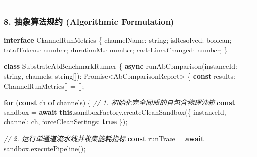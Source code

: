 \documentclass[
]{ctexart}
\newenvironment{Shaded}{}{}
\newcommand{\AttributeTok}[1]{\textcolor[rgb]{0.49,0.56,0.16}{#1}}
\newcommand{\BuiltInTok}[1]{\textcolor[rgb]{0.00,0.50,0.00}{#1}}
\newcommand{\CommentTok}[1]{\textcolor[rgb]{0.38,0.63,0.69}{\textit{#1}}}
\newcommand{\ControlFlowTok}[1]{\textcolor[rgb]{0.00,0.44,0.13}{\textbf{#1}}}
\newcommand{\DataTypeTok}[1]{\textcolor[rgb]{0.56,0.13,0.00}{#1}}
\newcommand{\FunctionTok}[1]{\textcolor[rgb]{0.02,0.16,0.49}{#1}}
\newcommand{\KeywordTok}[1]{\textcolor[rgb]{0.00,0.44,0.13}{\textbf{#1}}}
\newcommand{\NormalTok}[1]{#1}
\newcommand{\OperatorTok}[1]{\textcolor[rgb]{0.40,0.40,0.40}{#1}}
\renewcommand{\_}{\discretionary{}{}{\textunderscore}}
\begin{document}
\begin{center}\rule{0.5\linewidth}{0.5pt}\end{center}

\subsubsection{8. 抽象算法规约 (Algorithmic
Formulation)}\label{ux62bdux8c61ux7b97ux6cd5ux89c4ux7ea6-algorithmic-formulation-18}

\begin{Shaded}
\begin{Highlighting}[]
\KeywordTok{interface}\NormalTok{ ChannelRunMetrics \{}
\NormalTok{  channelName}\OperatorTok{:} \DataTypeTok{string}\OperatorTok{;}
\NormalTok{  isResolved}\OperatorTok{:} \DataTypeTok{boolean}\OperatorTok{;}
\NormalTok{  totalTokens}\OperatorTok{:} \DataTypeTok{number}\OperatorTok{;}
\NormalTok{  durationMs}\OperatorTok{:} \DataTypeTok{number}\OperatorTok{;}
\NormalTok{  codeLinesChanged}\OperatorTok{:} \DataTypeTok{number}\OperatorTok{;}
\NormalTok{\}}

\KeywordTok{class}\NormalTok{ SubstrateAbBenchmarkRunner \{}
  \KeywordTok{async} \FunctionTok{runAbComparison}\NormalTok{(instanceId}\OperatorTok{:} \DataTypeTok{string}\OperatorTok{,}\NormalTok{ channels}\OperatorTok{:} \DataTypeTok{string}\NormalTok{[])}\OperatorTok{:} \BuiltInTok{Promise}\OperatorTok{\textless{}}\NormalTok{AbComparisonReport}\OperatorTok{\textgreater{}}\NormalTok{ \{}
    \KeywordTok{const}\NormalTok{ results}\OperatorTok{:}\NormalTok{ ChannelRunMetrics[] }\OperatorTok{=}\NormalTok{ []}\OperatorTok{;}

    \ControlFlowTok{for}\NormalTok{ (}\KeywordTok{const}\NormalTok{ ch }\KeywordTok{of}\NormalTok{ channels) \{}
      \CommentTok{// 1. 初始化完全同质的自包含物理沙箱}
      \KeywordTok{const}\NormalTok{ sandbox }\OperatorTok{=} \ControlFlowTok{await} \KeywordTok{this}\OperatorTok{.}\AttributeTok{sandboxFactory}\OperatorTok{.}\FunctionTok{createCleanSandbox}\NormalTok{(\{}
\NormalTok{        instanceId}\OperatorTok{,}
\NormalTok{        channel}\OperatorTok{:}\NormalTok{ ch}\OperatorTok{,}
\NormalTok{        forceCleanSettings}\OperatorTok{:} \KeywordTok{true}
\NormalTok{      \})}\OperatorTok{;}

      \CommentTok{// 2. 运行单通道流水线并收集能耗指标}
      \KeywordTok{const}\NormalTok{ runTrace }\OperatorTok{=} \ControlFlowTok{await}\NormalTok{ sandbox}\OperatorTok{.}\FunctionTok{executePipeline}\NormalTok{()}\OperatorTok{;}


\end{Highlighting}
\end{Shaded}
\end{document}
